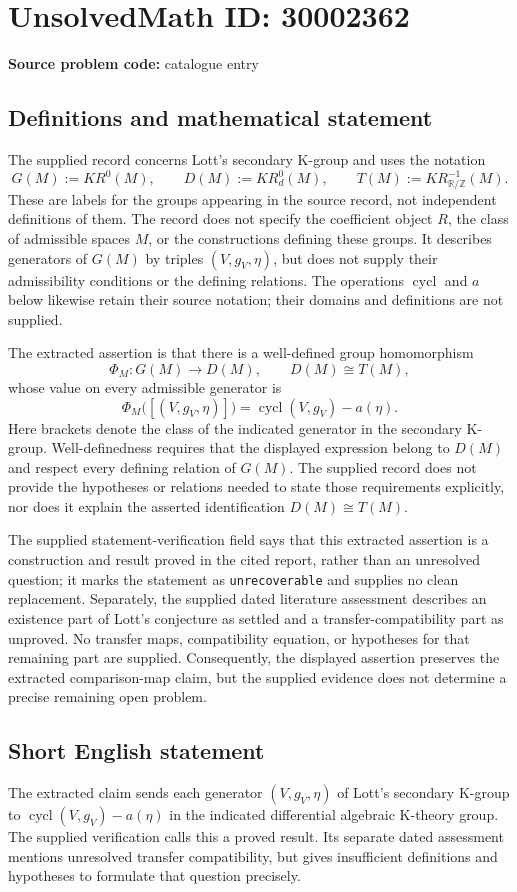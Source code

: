 \documentclass[11pt]{article}
\begin{document}
\section*{UnsolvedMath ID: 30002362}
\textbf{Source problem code:} catalogue entry
\subsection{Definitions and mathematical statement}
The supplied record concerns Lott's secondary K-group and uses the notation
\[
G(M):=KR^0(M),\qquad D(M):=KR_d^0(M),\qquad T(M):=KR_{\mathbb{R}/\mathbb{Z}}^{-1}(M).
\]
These are labels for the groups appearing in the source record, not independent definitions of them. The record does not specify the coefficient object \(R\), the class of admissible spaces \(M\), or the constructions defining these groups. It describes generators of \(G(M)\) by triples \((V,g_V,\eta)\), but does not supply their admissibility conditions or the defining relations. The operations \(\operatorname{cycl}\) and \(a\) below likewise retain their source notation; their domains and definitions are not supplied.

The extracted assertion is that there is a well-defined group homomorphism
\[
\Phi_M:G(M)\longrightarrow D(M),
\qquad D(M)\cong T(M),
\]
whose value on every admissible generator is
\[
\Phi_M\bigl([(V,g_V,\eta)]\bigr)
=\operatorname{cycl}(V,g_V)-a(\eta).
\]
Here brackets denote the class of the indicated generator in the secondary K-group. Well-definedness requires that the displayed expression belong to \(D(M)\) and respect every defining relation of \(G(M)\). The supplied record does not provide the hypotheses or relations needed to state those requirements explicitly, nor does it explain the asserted identification \(D(M)\cong T(M)\).

The supplied statement-verification field says that this extracted assertion is a construction and result proved in the cited report, rather than an unresolved question; it marks the statement as \texttt{unrecoverable} and supplies no clean replacement. Separately, the supplied dated literature assessment describes an existence part of Lott's conjecture as settled and a transfer-compatibility part as unproved. No transfer maps, compatibility equation, or hypotheses for that remaining part are supplied. Consequently, the displayed assertion preserves the extracted comparison-map claim, but the supplied evidence does not determine a precise remaining open problem.
\subsection{Short English statement}
The extracted claim sends each generator \((V,g_V,\eta)\) of Lott's secondary K-group to \(\operatorname{cycl}(V,g_V)-a(\eta)\) in the indicated differential algebraic K-theory group. The supplied verification calls this a proved result. Its separate dated assessment mentions unresolved transfer compatibility, but gives insufficient definitions and hypotheses to formulate that question precisely.
\end{document}

